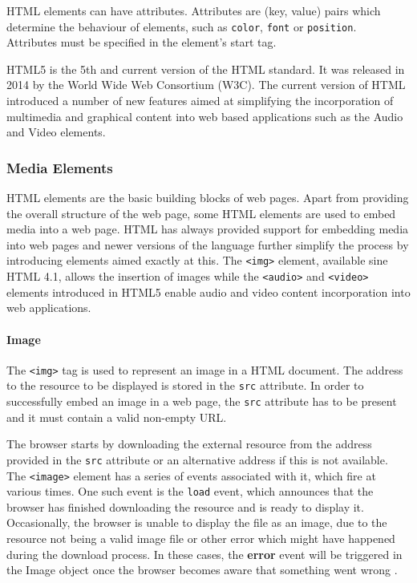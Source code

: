 \documentclass[10pt,a4paper,twoside]{book}
\begin{document}
HTML elements can have attributes. Attributes are (key, value) pairs which determine the behaviour of elements, such as \texttt{color}, \texttt{font} or \texttt{position}. Attributes must be specified in the element's start tag\cite{world1999html}.

HTML5 is the 5th and current version of the HTML standard. It was released in 2014 by the World Wide Web Consortium (W3C). The current version of HTML introduced a number of new features aimed at simplifying the incorporation of multimedia and graphical content into web based applications\cite{berjon2014html} such as the Audio and Video elements.

\subsubsection{Media Elements}
HTML elements are the basic building blocks of web pages. Apart from providing the overall structure of the web page, some HTML elements are used to embed media into a web page. HTML has always provided support for embedding media into web pages and newer versions of the language further simplify the process by introducing elements aimed exactly at this. The \texttt{<img>} element, available sine HTML 4.1, allows the insertion of images while the \texttt{<audio>} and \texttt{<video>} elements introduced in HTML5 enable audio and video content incorporation into web applications.

\paragraph{Image}
The \texttt{<img>} tag is used to represent an image in a HTML document. The address to the resource to be displayed is stored in the \texttt{src} attribute. In order to successfully embed an image in a web page, the \texttt{src} attribute has to be present and it must contain a valid non-empty URL\cite{berjon2014html}.

The browser starts by downloading the external resource from the address provided in the \texttt{src} attribute or an alternative address if this is not available. The \texttt{<image>} element has a series of events associated with it, which fire at various times. One such event is the \texttt{load} event, which announces that the browser has finished downloading the resource and is ready to display it. 
Occasionally, the browser is unable to display the file as an image, due to the resource not being a valid image file or other error which might have happened during the download process. In these cases, the \textbf{error} event will be triggered in the Image object once the browser becomes aware that something went wrong \cite{berjon2014html}.
\end{document}
